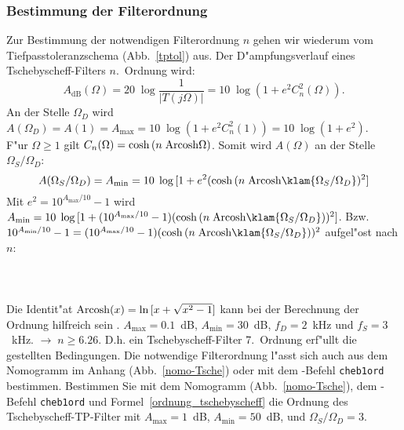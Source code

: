 \subsubsection{Bestimmung der Filterordnung}
Zur Bestimmung der notwendigen Filterordnung $n$ gehen wir wiederum vom
Tief\-pass\-toleranzschema (Abb.~\ref{tptol}) aus. Der
D"ampfungsverlauf eines Tschebyscheff-Filters $n.$~Ordnung wird:
\begin{equation}
A_{\text{dB}}(\Omega)=20\;\log{\frac{1}{|T(j\Omega)|}}=
10\;\log{(1+e^{2}C_{n}^{2}(\Omega))}.
\end{equation}
\nit An der Stelle $\Omega_{D}$ wird $A(\Omega_{D})=A(1)=A_{\max}=10\;\log{(1+e^{2}C_{n}^{2}(1))}=
10\;\log{(1+e^{2})}$.\\
\nit F"ur $\Omega\geq1$ gilt $C_{n}(\Omega)=\cosh{(n\;{\rm Arcosh}\Omega)}$.
Somit wird $A(\Omega)$ an der Stelle $\Omega_{S}/\Omega_{D}$:
\[
A(\Omega_{S}/\Omega_{D})=A_{\min}=10\;\log{[1+e^{2}(\cosh{(n\;{\rm Arcosh}\klam{\Omega_{S}/\Omega_{D}}})^{2}]}
\]
Mit $e^{2}=10^{A_{\max}/10}-1$ wird $A_{\min}=10\;\log{[1+(10^{A_{\max}/10}-1)
(\cosh{(n\;{\rm Arcosh}\klam{\Omega_{S}/\Omega_{D}})})^{2}]}$.
Bzw. $10^{A_{\min}/10}-1=(10^{A_{\max}/10}-1) (\cosh{(n\;{\rm Arcosh}\klam{\Omega_{S}/\Omega_{D}})})^{2}$
aufgel"ost nach $n$:\\ ~~\\
\\~\\
\nit Die Identit"at ${\rm Arcosh}(x)=\ln{[x+\sqrt{x^{2}-1}]}$ kann bei der Berechnung der Ordnung hilfreich sein \cite{BRO:SEM:91}.
$A_{\max}=0.1$~dB, $A_{\min}=30$~dB, $f_{D}=2$~kHz und $f_{S}=3$~kHz. $\longrightarrow \; n\geq 6.26$. 
D.h. ein Tschebyscheff-Filter 7.~Ordnung erf"ullt die gestellten
Bedingungen.  Die notwendige Filterordnung l"asst sich auch aus dem
Nomogramm im Anhang (Abb.~\ref{nomo-Tsche}) oder mit dem \matlogo-Befehl {\tt cheb1ord} bestimmen.
\aufg
Bestimmen Sie mit dem Nomogramm (Abb.~\ref{nomo-Tsche}), dem \matlogo-Befehl {\tt cheb1ord} und Formel~\ref{ordnung_tschebyscheff} die Ordnung des Tschebyscheff-TP-Filter mit $A_{\max}=1$~dB, $A_{\min}=50$~dB, und $\Omega_{S}/\Omega_D=3$.
\clearpage
